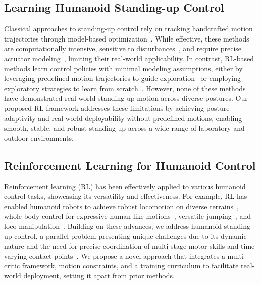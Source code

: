 \subsection{Learning Humanoid Standing-up Control}
Classical approaches to standing-up control rely on tracking handcrafted motion trajectories through model-based optimization~\cite{kanehiro2003first,kanehiro2007getting,kuniyoshi2004dynamic,stuckler2006getting}. While effective, these methods are computationally intensive, sensitive to disturbances~\cite{luo2014multi,lee2019robust}, and require precise actuator modeling~\cite{hwangbo2019learning}, limiting their real-world applicability. In contrast, RL-based methods learn control policies with minimal modeling assumptions, either by leveraging predefined motion trajectories to guide exploration~\cite{peng2018deepmimic,Peng2022ASE,yang2023learning,haarnoja2024learning} or employing exploratory strategies to learn from scratch~\cite{tao2022learning}.  However, none of these methods have demonstrated real-world standing-up motion across diverse postures. Our proposed RL framework addresses these limitations by achieving posture adaptivity and real-world deployability without predefined motions, enabling smooth, stable, and robust standing-up across a wide range of laboratory and outdoor environments.

\subsection{Reinforcement Learning for Humanoid Control}
Reinforcement learning (RL) has been effectively applied to various humanoid control tasks, showcasing its versatility and effectiveness. For example, RL has enabled humanoid robots to achieve robust locomotion on diverse terrains~\cite{radosavovic2024real,li2024reinforcement,zhuang2024humanoid,long2024learning}, whole-body control for expressive human-like motions~\cite{peng2018deepmimic,Peng2022ASE,He2024OmniH2OUA,he2024hover,Cheng2024ExpressiveWC}, versatile jumping~\cite{Zhang2024WoCoCoLW}, and loco-manipulation~\cite{dao2024sim,liu2024opt2skill,wang2024hypermotion}. Building on these advances, we address humanoid standing-up control, a parallel problem presenting unique challenges due to its dynamic nature and the need for precise coordination of multi-stage motor skills and time-varying contact points~\cite{kanehiro2003first,luo2014multi}. We propose a novel approach that integrates a multi-critic framework, motion constraints, and a training curriculum to facilitate real-world deployment, setting it apart from prior methods.

